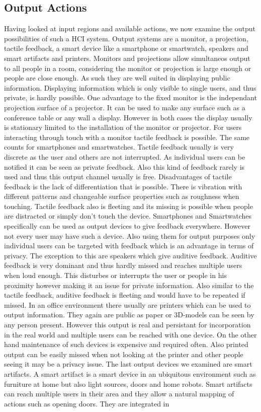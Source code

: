 \documentclass{acm_proc_article-sp}
\begin{document}
\subsection{Output Actions}

Having looked at input regions and available actions, we now examine the output possibilities of such a HCI system. Output systems are a monitor, a projection, tactile feedback, a smart device like a smartphone or smartwatch, speakers and smart artifacts and printers. Monitors and projections allow simultaneos output to all people in a room, considering the monitor or projection is large enough or people are close enough. As such they are well suited in displaying public information. Displaying information which is only visible to single users, and thus private, is hardly possible. One advantage to the fixed monitor is the independant projection surface of a projector. It can be used to make any surface such as a conference table or any wall a display. However in both cases the display usually is stationary limited to the installation of the monitor or projector. For users interacting through touch with a monitor tactile feedback is possible. The same counts for smartphones and smartwatches. Tactile feedback usually is very discrete as the user and others are not interrupted. As individual users can be notified it can be seen as private feedback. Also this kind of feedback rarely is used and thus this output channel usually is free. Disadvantages of tactile feedback is the lack of differentiation that is possible. There is vibration with different patterns and changeable surface properties such as roughness when touching. Tactile feedback also is fleeting and its missing is possible when people are distracted or simply don’t touch the device. Smartphones and Smartwatches specifically can be used as output devices to give feedback everywhere. However not every user may have such a device. Also using them for output purposes only individual users can be targeted with feedback which is an advantage in terms of privacy. The exception to this are speakers which give auditive feedback. Auditive feedback is very dominant and thus hardly missed and reaches multiple users when loud enough. This disturbes or interrupts the user or people in his proximity however making it an issue for private information. Also similar to the tactile feedback, auditive feedback is fleeting and would have to be repeated if missed. In an office environment there usually are printers which can be used to output information. They again are public as paper or 3D-models can be seen by any person present. However this output is real and persistant for incorporation in the real world and multiple users can be reached with one device. On the other hand maintenance of such devices is expensive and required often. Also printed output can be easily missed when not looking at the printer and other people seeing it may be a privacy issue. The last output devices we examined are smart artifacts. A smart artifact is a smart device in an ubiquitous environment such as furniture at home but also light sources, doors and home robots. Smart artifacts can reach multiple users in their area and they allow a natural mapping of actions such as opening doors. They are integrated in 
\end{document}
